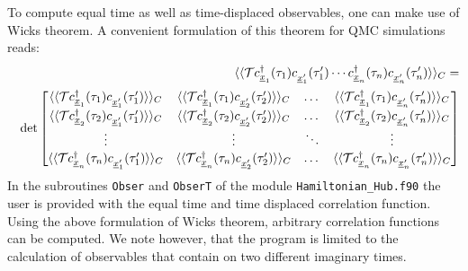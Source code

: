 To compute equal time as well as time-displaced observables,  one can make use of Wicks theorem. A convenient formulation of this theorem for  QMC simulations reads: 
\begin{eqnarray}
& & \langle \langle 	{\cal T}   c^{\dagger}_{\underline x_{1}}(\tau_{1}) c^{\phantom\dagger}_{{\underline x}'_{1}}(\tau'_{1})  
\cdots c^{\dagger}_{\underline x_{n}}(\tau_{n}) c^{\phantom\dagger}_{{\underline x}'_{n}}(\tau'_{n}) 
\rangle \rangle_{C} =
\nonumber \\ & & \det  
\begin{bmatrix}
   \langle \langle   {\cal T}   c^{\dagger}_{\underline x_{1}}(\tau_{1}) c^{\phantom\dagger}_{{\underline x}'_{1}}(\tau'_{1})  \rangle \rangle_{C} & 
    \langle \langle  {\cal T}   c^{\dagger}_{\underline x_{1}}(\tau_{1}) c^{\phantom\dagger}_{{\underline x}'_{2}}(\tau'_{2})  \rangle \rangle_{C}  & \dots   &   
    \langle \langle   {\cal T}   c^{\dagger}_{\underline x_{1}}(\tau_{1}) c^{\phantom\dagger}_{{\underline x}'_{n}}(\tau'_{n})  \rangle \rangle_{C}  \\
    \langle \langle   {\cal T}   c^{\dagger}_{\underline x_{2}}(\tau_{2}) c^{\phantom\dagger}_{{\underline x}'_{1}}(\tau'_{1})  \rangle \rangle_{C}  & 
      \langle \langle   {\cal T}   c^{\dagger}_{\underline x_{2}}(\tau_{2}) c^{\phantom\dagger}_{{\underline x}'_{2}}(\tau'_{2})  \rangle \rangle_{C}  & \dots  &
       \langle \langle   {\cal T}   c^{\dagger}_{\underline x_{2}}(\tau_{2}) c^{\phantom\dagger}_{{\underline x}'_{n}}(\tau'_{n})  \rangle \rangle_{C}   \\
    \vdots & \vdots &  \ddots & \vdots \\
    \langle \langle   {\cal T}   c^{\dagger}_{\underline x_{n}}(\tau_{n}) c^{\phantom\dagger}_{{\underline x}'_{1}}(\tau'_{1})  \rangle \rangle_{C}   & 
     \langle \langle   {\cal T}   c^{\dagger}_{\underline x_{n}}(\tau_{n}) c^{\phantom\dagger}_{{\underline x}'_{2}}(\tau'_{2})  \rangle \rangle_{C}   & \dots  & 
     \langle \langle   {\cal T}   c^{\dagger}_{\underline x_{n}}(\tau_{n}) c^{\phantom\dagger}_{{\underline x}'_{n}}(\tau'_{n})  \rangle \rangle_{C}
 \end{bmatrix}
\end{eqnarray}
In the subroutines   \texttt{Obser}  and \texttt{ObserT} of  the module \texttt{Hamiltonian\_Hub.f90}    the user is provided with the equal time and time displaced correlation function. Using the  above  formulation  of  Wicks theorem, arbitrary  correlation functions can be computed. We note however, that the program is limited to the calculation of observables that contain on two different imaginary times.  



